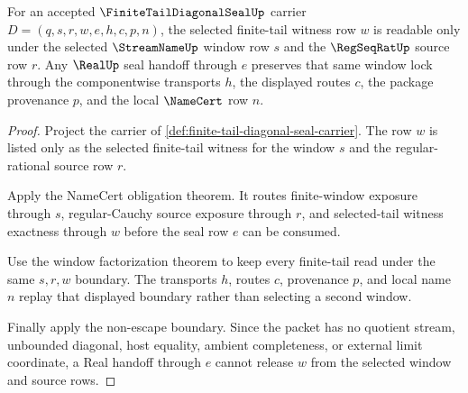 \begin{theorem}
\label{thm:finite-tail-diagonal-seal-window-lock}
For an accepted $\FiniteTailDiagonalSealUp$ carrier $D=(q,s,r,w,e,h,c,p,n)$, the selected finite-tail witness row $w$ is readable only under the selected $\StreamNameUp$ window row $s$ and the $\RegSeqRatUp$ source row $r$. Any $\RealUp$ seal handoff through $e$ preserves that same window lock through the componentwise transports $h$, the displayed routes $c$, the package provenance $p$, and the local $\NameCert$ row $n$.
\end{theorem}
\begin{proof}
Project the carrier of \autoref{def:finite-tail-diagonal-seal-carrier}. The row $w$ is listed only as the selected finite-tail witness for the window $s$ and the regular-rational source row $r$.

Apply the NameCert obligation theorem. It routes finite-window exposure through $s$, regular-Cauchy source exposure through $r$, and selected-tail witness exactness through $w$ before the seal row $e$ can be consumed.

Use the window factorization theorem to keep every finite-tail read under the same $s,r,w$ boundary. The transports $h$, routes $c$, provenance $p$, and local name $n$ replay that displayed boundary rather than selecting a second window.

Finally apply the non-escape boundary. Since the packet has no quotient stream, unbounded diagonal, host equality, ambient completeness, or external limit coordinate, a Real handoff through $e$ cannot release $w$ from the selected window and source rows.
\end{proof}

